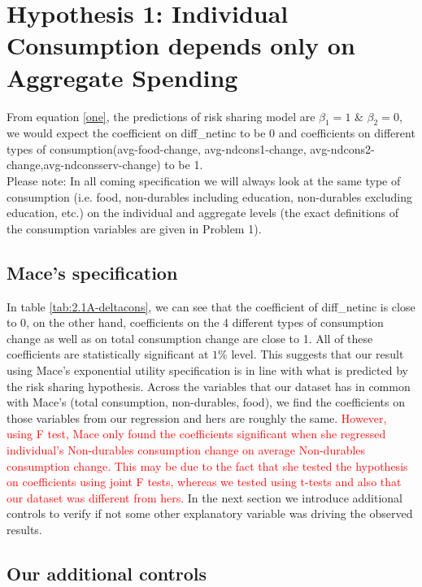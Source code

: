 \documentclass[12pt,a4paper]{article}
\begin{document}
\section*{Hypothesis 1: Individual Consumption depends only on Aggregate Spending}
From equation \eqref{one}, the predictions of risk sharing model are $\beta_1=1$ \& $\beta_2=0$, we would expect the coefficient on diff\_netinc to be 0 and coefficients on different types of consumption(avg-food-change, avg-ndcons1-change,  avg-ndcons2-change,avg-ndconsserv-change) to be 1. \\

Please note: In all coming specification we will always look at the same type of consumption (i.e. food, non-durables including education, non-durables excluding education, etc.) on the individual and aggregate levels (the exact definitions of the consumption variables are given in  Problem 1).

\subsection*{Mace's specification}



In table \ref{tab:2.1A-deltacons}, we can see that the coefficient of diff\_netinc is close to 0, on the other hand, coefficients on the 4 different types of consumption change as well as on total consumption change are close to 1. All of these coefficients are statistically significant at $1\%$ level. This suggests that our result using Mace's exponential utility specification is in line with what is predicted by the risk sharing hypothesis. Across the variables that our dataset has in common with Mace's (total consumption, non-durables, food), we find the coefficients on those variables from our regression and hers are roughly the same. \textcolor{red}{However, using F test, Mace only found the coefficients significant when she regressed individual's Non-durables consumption change on average Non-durables consumption change. This may be due to the fact that she tested the hypothesis on coefficients using joint F tests, whereas we tested using t-tests and also that our dataset was different from hers.} In the next section we introduce additional controls to verify if not some other explanatory variable was driving the observed results.

\subsection*{Our additional controls}
\end{document}
